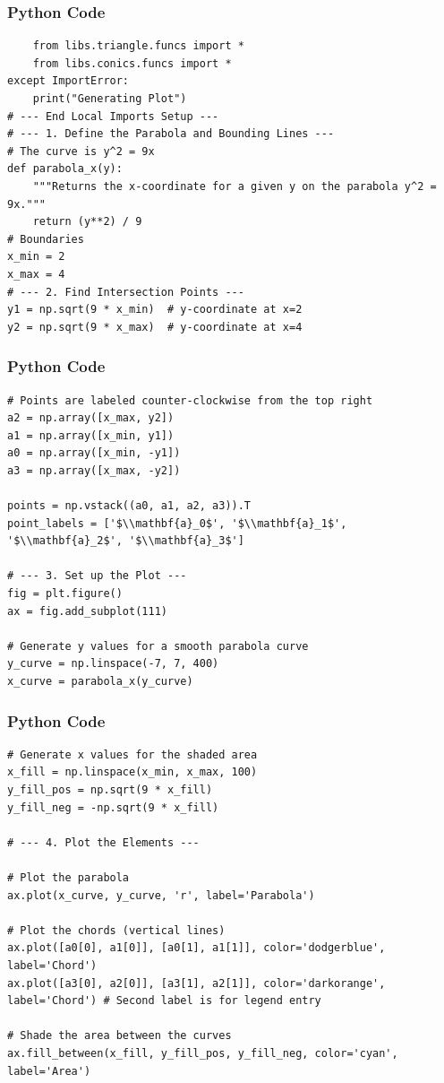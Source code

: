 \documentclass{beamer}
\begin{document}
\begin{frame}[fragile]
\frametitle{Python Code}
\begin{lstlisting}
    from libs.triangle.funcs import *
    from libs.conics.funcs import *
except ImportError:
    print("Generating Plot")
# --- End Local Imports Setup ---
# --- 1. Define the Parabola and Bounding Lines ---
# The curve is y^2 = 9x
def parabola_x(y):
    """Returns the x-coordinate for a given y on the parabola y^2 = 9x."""
    return (y**2) / 9
# Boundaries
x_min = 2
x_max = 4
# --- 2. Find Intersection Points ---
y1 = np.sqrt(9 * x_min)  # y-coordinate at x=2
y2 = np.sqrt(9 * x_max)  # y-coordinate at x=4
 \end{lstlisting}
 \end{frame}
\begin{frame}[fragile]
\frametitle{Python Code}
\begin{lstlisting}
# Points are labeled counter-clockwise from the top right
a2 = np.array([x_max, y2])
a1 = np.array([x_min, y1])
a0 = np.array([x_min, -y1])
a3 = np.array([x_max, -y2])

points = np.vstack((a0, a1, a2, a3)).T
point_labels = ['$\\mathbf{a}_0$', '$\\mathbf{a}_1$', '$\\mathbf{a}_2$', '$\\mathbf{a}_3$']

# --- 3. Set up the Plot ---
fig = plt.figure()
ax = fig.add_subplot(111)

# Generate y values for a smooth parabola curve
y_curve = np.linspace(-7, 7, 400)
x_curve = parabola_x(y_curve)
 \end{lstlisting}
 \end{frame}
\begin{frame}[fragile]
\frametitle{Python Code}
\begin{lstlisting}
# Generate x values for the shaded area
x_fill = np.linspace(x_min, x_max, 100)
y_fill_pos = np.sqrt(9 * x_fill)
y_fill_neg = -np.sqrt(9 * x_fill)

# --- 4. Plot the Elements ---

# Plot the parabola
ax.plot(x_curve, y_curve, 'r', label='Parabola')

# Plot the chords (vertical lines)
ax.plot([a0[0], a1[0]], [a0[1], a1[1]], color='dodgerblue', label='Chord')
ax.plot([a3[0], a2[0]], [a3[1], a2[1]], color='darkorange', label='Chord') # Second label is for legend entry

# Shade the area between the curves
ax.fill_between(x_fill, y_fill_pos, y_fill_neg, color='cyan', label='Area')
 \end{lstlisting}
 \end{frame}
\end{document}
